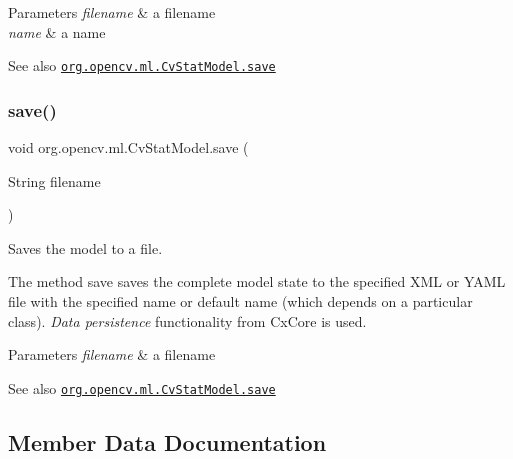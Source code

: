 \begin{DoxyParams}{Parameters}
{\em filename} & a filename \\
\hline
{\em name} & a name\\
\hline
\end{DoxyParams}
\begin{DoxySeeAlso}{See also}
\href{http://docs.opencv.org/modules/ml/doc/statistical_models.html#cvstatmodel-save}{\tt org.\+opencv.\+ml.\+Cv\+Stat\+Model.\+save} 
\end{DoxySeeAlso}
\mbox{\label{classorg_1_1opencv_1_1ml_1_1_cv_stat_model_a48a3e488b527a6236709db13fe88112a}} 
\subsubsection{\texorpdfstring{save()}{save()}\hspace{0.1cm}{\footnotesize\ttfamily [2/2]}}
{\footnotesize\ttfamily void org.\+opencv.\+ml.\+Cv\+Stat\+Model.\+save (\begin{DoxyParamCaption}\item[{String}]{filename }\end{DoxyParamCaption})}

Saves the model to a file.

The method {\ttfamily save} saves the complete model state to the specified X\+ML or Y\+A\+ML file with the specified name or default name (which depends on a particular class). {\itshape Data persistence} functionality from {\ttfamily Cx\+Core} is used.


\begin{DoxyParams}{Parameters}
{\em filename} & a filename\\
\hline
\end{DoxyParams}
\begin{DoxySeeAlso}{See also}
\href{http://docs.opencv.org/modules/ml/doc/statistical_models.html#cvstatmodel-save}{\tt org.\+opencv.\+ml.\+Cv\+Stat\+Model.\+save} 
\end{DoxySeeAlso}


\subsection{Member Data Documentation}
\mbox{\label{classorg_1_1opencv_1_1ml_1_1_cv_stat_model_a61dd522c3b9e472bffe468f00d53ca50}} 
